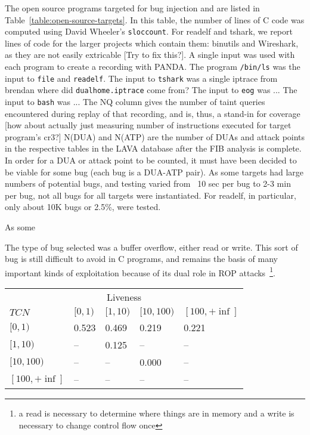 The open source programs targeted for bug injection and are listed in Table~\ref{table:open-source-targets}.
In this table, the number of lines of C code was computed using David Wheeler's \verb+sloccount+.  
For readelf and tshark, we report lines of code for the larger projects which contain them: binutils and Wireshark, as they are not easily extricable [Try to fix this?].
A single input was used with each program to create a recording with PANDA.
The program \verb+/bin/ls+ was the input to \verb+file+ and \verb+readelf+.
The input to \verb+tshark+ was a single iptrace from brendan where did \verb+dualhome.iptrace+ come from? 
The input to \verb+eog+ was ...
The input to \verb+bash+ was ...
The NQ column gives the number of taint queries encountered during replay of that recording, and is, thus, a stand-in for coverage [how about actually just measuring number of instructions executed for target program's cr3?]
N(DUA) and N(ATP) are the number of DUAs and attack points in the respective tables in the LAVA database after the FIB analysis is complete.
In order for a DUA or attack point to be counted, it must have been decided to be viable for some bug (each bug is a DUA-ATP pair).
As some targets had large numbers of potential bugs, and testing varied from ~10 sec per bug to 2-3 min per bug, not all bugs for all targets were instantiated.  
For readelf, in particular, only about 10K bugs or 2.5\%, were tested.



As some 

The type of bug selected was a buffer overflow, either read or write.
This sort of bug is still difficult to avoid in C programs, and remains the basis of many important kinds of exploitation because of its dual role in ROP attacks~\footnote{a read is necessary to determine where things are in memory and a write is necessary to change control flow once}.


\begin{table}
\centering
\begin{tabular}{l|l|l|l|l} 
 & \multicolumn{3}{c}{Liveness} &  \\  
$TCN$ &         $[0,1)$ & $[1,10)$ & $[10,100)$ & $[100,+\inf]$ \\  \hline 
$[0,1)$ &       0.523   & 0.469    & 0.219      & 0.221 \\
$[1,10)$ &      --      & 0.125    & --         & --    \\
$[10,100)$ &    --      & --       & 0.000      & --    \\
$[100,+\inf]$ & --      & --       & --         & -- \\ 
\end{tabular}
\end{table}



